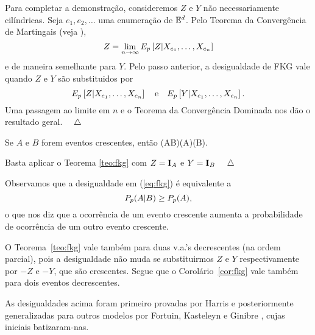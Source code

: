 Para completar a demonstração, consideremos $Z$ e $Y$ não necessariamente
cilíndricas. Seja $e_1,e_2,\ldots$ uma enumeração de $\mathbb{E}^d$. Pelo Teorema da
Convergência de Martingais (veja \cite{kn:B}),
$$Z=\lim_{n\to\infty}E_p\left[Z|X_{e_1},\ldots,X_{e_n}\right]$$
e de maneira semelhante para $Y$.
Pelo passo anterior, a desigualdade de FKG vale quando $Z$ e $Y$ são substituidos
por $$E_p\left[Z|X_{e_1},\ldots,X_{e_n}\right]\quad\mbox{e}\quad 
E_p\left[Y|X_{e_1},\ldots,X_{e_n}\right].$$ Uma passagem ao limite em $n$ e o Teorema
da Convergência Dominada nos dão o resultado geral. $\quad\triangle$

\vs

\bcor
\label{cor:fkg}
Se $A$ e $B$ forem eventos crescentes, então
\beq
\label{eq:fkg}
\p(A\cap B)\geq\p(A)\p(B).
\eeq
\ecor

\vs


Basta aplicar o Teorema \ref{teo:fkg} com $Z=\mbox{\bf I}_A$ e $Y=\mbox{\bf I}_B$ $\quad\triangle$

\vs

Observamos que a desigualdade em (\ref{eq:fkg}) é equivalente a
$$P_p(A|B)\geq P_p(A),$$ 
o que nos diz que a ocorrência de um evento crescente aumenta a probabilidade
de ocorrência de um outro evento crescente.

\vs

O Teorema~\ref{teo:fkg} vale também para duas v.a.'s 
decrescentes (na ordem parcial), pois a desigualdade não muda se substituirmos $Z$ e $Y$ respectivamente
por $-Z$ e $-Y$, que são crescentes. Segue que o Corolário~\ref{cor:fkg} vale
também para dois eventos decrescentes.

\vs

As desigualdades acima foram primeiro provadas por Harris \cite{kn:H} e
posteriormente generalizadas para outros modelos por Fortuin, Kasteleyn e
Ginibre \cite{kn:FKG}, cujas iniciais batizaram-nas.
